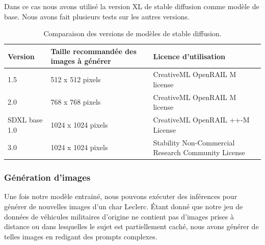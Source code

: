 Dans ce cas nous avons utilisé la version XL de stable diffusion comme modèle de base. Nous avons fait plusieurs tests sur les autres versions.

\begin{table}[H]
    \centering
    \begin{tabular}{|p{3cm}|p{4cm}|p{7cm}|}
        \hline
        \textbf{Version} & \textbf{Taille recommandée des images à générer} & \textbf{Licence d'utilisation}                      \\ \hline
        1.5              & 512 x 512 pixels                                 & CreativeML OpenRAIL M license                       \\ \hline
        2.0              & 768 x 768 pixels                                 & CreativeML OpenRAIL M license                       \\ \hline
        SDXL base 1.0    & 1024 x 1024 pixels                               & CreativeML OpenRAIL ++-M License                    \\ \hline
        3.0              & 1024 x 1024 pixels                               & Stability Non-Commercial Research Community License \\ \hline
    \end{tabular}
    \caption{Comparaison des versions de modèles de stable diffusion.\cite{wiki:stable_diffusion}}
    \label{tab:modeles}
\end{table}



\subsubsection{Génération d'images}

Une fois notre modèle entrainé, nous pouvons exécuter des inférences pour générer de nouvelles images d'un char Leclerc.
Étant donné que notre jeu de données de véhicules militaires d'origine ne contient pas d'images prises à distance ou dans lesquelles le sujet est partiellement caché, nous avons générer de telles images en redigant des prompts complexes.\\

